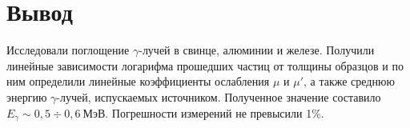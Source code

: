 \documentclass[letterpaper,12pt]{article}
\begin{document}
	
	\section{Вывод}
	Исследовали поглощение $\gamma$-лучей в свинце, алюминии и железе. Получили линейные зависимости логарифма прошедших частиц от толщины образцов и по ним определили линейные коэффициенты ослабления $\mu$ и $\mu'$, а также среднюю энергию $\gamma$-лучей, испускаемых источником.  Полученное значение составило $E_{\gamma} \sim 0,5\div0,6 ~\text{МэВ}$. Погрешности измерений не превысили 1\%.
	
	
	
\end{document}
